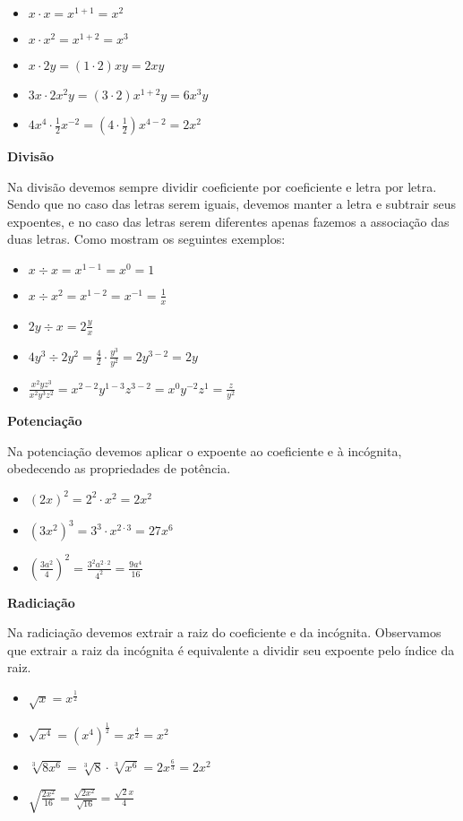  \begin{itemize}
   \item $x \cdot x = x^{1+1}= x^2$
   \item $x \cdot x^2= x^{1+2}= x^3$
   \item $x \cdot 2y= (1 \cdot 2)xy= 2xy$
   \item $3x \cdot 2x^2y= (3 \cdot 2)x^{1+2}y= 6x^3y$
   \item $4x^4 \cdot \frac{1}{2}x^{-2}= (4 \cdot \frac{1}{2})x^{4-2}= 2x^2$
  \end{itemize}

  \vskip0.3cm 
  
   \textbf{Divisão}
   
   Na divisão devemos sempre dividir coeficiente por coeficiente e letra por letra. Sendo que no caso das letras serem iguais, devemos manter a letra e subtrair seus expoentes, e no caso das letras serem diferentes apenas fazemos a associação das duas letras. Como mostram os seguintes exemplos:
   
  \begin{itemize}
   \item $x \div x= x^{1-1}= x^0= 1$
   \item $x \div x^2= x^{1-2}= x^{-1}= \frac{1}{x}$
   \item $2y \div x= 2\frac{y}{x}$
   \item $4y^3 \div 2y^2= \frac{4}{2} \cdot \frac{y^3}{y^2}= 2y^{3-2}= 2y$
   \item $\frac{x^2yz^3}{x^2y^3z^2}= x^{2-2}y^{1-3}z^{3-2}= x^0 y^{-2}z^{1}= \frac{z}{y^2}$  
  \end{itemize}
  
 \vskip0.3cm 
  
  \textbf{Potenciação}
  
  Na potenciação devemos aplicar o expoente ao coeficiente e à incógnita, obedecendo as propriedades de potência.
  
    \begin{itemize}
     \item $(2x)^2= 2^2 \cdot x^2= 2x^2$
     \item $(3x^2)^3= 3^3 \cdot x^{2\cdot 3}= 27x^6$
     \item $\left(\frac{3a^2}{4}\right)^2= \frac{3^2 a^{2 \cdot 2}}{4^2}= \frac{9a^4}{16}$
    \end{itemize}

  \vskip0.3cm 
  
  \textbf{Radiciação}

  Na radiciação devemos extrair a raiz do coeficiente e da incógnita. Observamos que extrair a raiz da incógnita é equivalente a dividir seu expoente pelo índice da raiz.
    \begin{itemize}
     \item $\sqrt{x}= x^{\frac{1}{2}}$
     \item $\sqrt{x^4}= (x^4)^{\frac{1}{2}}= x^{\frac{4}{2}}= x^2$
     \item $\sqrt[3]{8x^6}= \sqrt[3]{8} \cdot \sqrt[3]{x^6}= 2 x^{\frac{6}{3}}= 2x^2$
     \item $\sqrt{\frac{2x^2}{16}}= \frac{\sqrt{2x^2}}{\sqrt{16}}= \frac{\sqrt{2}x}{4}$
    \end{itemize}

